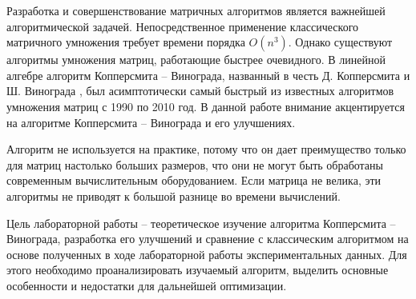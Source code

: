 \setcounter{page}{2}
Разработка и совершенствование матричных алгоритмов является важнейшей алгоритмической задачей. Непосредственное применение классического матричного умножения требует времени порядка $O(n^3)$. Однако существуют алгоритмы умножения матриц, работающие быстрее очевидного. В линейной алгебре алгоритм Копперсмита – Винограда\cite{winograd-origin}, названный в честь Д. Копперсмита и Ш. Винограда , был асимптотически самый быстрый из известных алгоритмов умножения матриц с 1990 по 2010 год. В данной работе внимание акцентируется на алгоритме Копперсмита – Винограда и его улучшениях. 

Алгоритм не используется на практике, потому что он дает преимущество только для матриц настолько больших размеров, что они не могут быть обработаны современным вычислительным оборудованием. Если матрица не велика, эти алгоритмы не приводят к большой разнице во времени вычислений. 

Цель лабораторной работы -- теоретическое изучение алгоритма Копперсмита – Винограда, разработка его улучшений и сравнение с классическим алгоритмом на основе полученных в ходе лабораторной работы экспериментальных данных. Для этого необходимо проанализировать изучаемый алгоритм, выделить основные особенности и недостатки для дальнейшей оптимизации. 